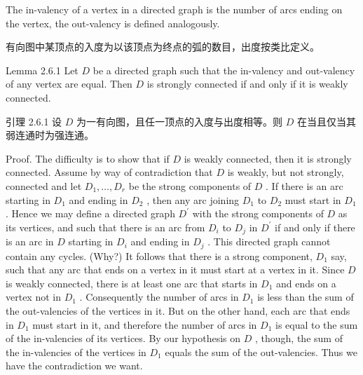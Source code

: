 \documentclass[10pt]{article}
\begin{document}
The in-valency of a vertex in a directed graph is the number of arcs ending on the vertex, the out-valency is defined analogously.

\begin{tcolorbox}\relax
有向图中某顶点的入度为以该顶点为终点的弧的数目，出度按类比定义。
\end{tcolorbox}

Lemma 2.6.1 Let \(D\) be a directed graph such that the in-valency and out-valency of any vertex are equal. Then \(D\) is strongly connected if and only if it is weakly connected.

\begin{tcolorbox}\relax
引理 2.6.1 设 \(D\) 为一有向图，且任一顶点的入度与出度相等。则 \(D\) 在当且仅当其弱连通时为强连通。
\end{tcolorbox}

Proof. The difficulty is to show that if \(D\) is weakly connected, then it is strongly connected. Assume by way of contradiction that \(D\) is weakly, but not strongly, connected and let \({D}_{1},\ldots ,{D}_{r}\) be the strong components of \(D\) . If there is an arc starting in \({D}_{1}\) and ending in \({D}_{2}\) , then any arc joining \({D}_{1}\) to \({D}_{2}\) must start in \({D}_{1}\) . Hence we may define a directed graph \({D}^{\prime }\) with the strong components of \(D\) as its vertices, and such that there is an arc from \({D}_{i}\) to \({D}_{j}\) in \({D}^{\prime }\) if and only if there is an arc in \(D\) starting in \({D}_{i}\) and ending in \({D}_{j}\) . This directed graph cannot contain any cycles. (Why?) It follows that there is a strong component, \({D}_{1}\) say, such that any arc that ends on a vertex in it must start at a vertex in it. Since \(D\) is weakly connected, there is at least one arc that starts in \({D}_{1}\) and ends on a vertex not in \({D}_{1}\) . Consequently the number of arcs in \({D}_{1}\) is less than the sum of the out-valencies of the vertices in it. But on the other hand, each arc that ends in \({D}_{1}\) must start in it, and therefore the number of arcs in \({D}_{1}\) is equal to the sum of the in-valencies of its vertices. By our hypothesis on \(D\) , though, the sum of the in-valencies of the vertices in \({D}_{1}\) equals the sum of the out-valencies. Thus we have the contradiction we want.
\end{document}
